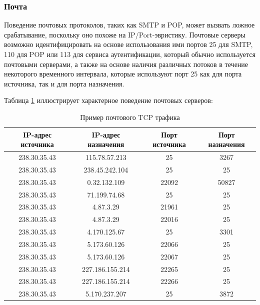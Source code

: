\documentclass[bachelor, och, coursework]{SCWorks}
\begin{document}
\subsubsection{Почта}
Поведение почтовых протоколов, таких как SMTP и POP, может вызвать ложное срабатывание, поскольку оно похоже на IP/Port-эвристику. Почтовые серверы возможно идентифицировать на основе использования ими портов 25 для SMTP, 110 для POP или 113 для сервиса аутентификации, который обычно используется почтовыми серверами, а также на основе наличия различных потоков в течение некоторого временного интервала, которые используют порт 25 как для порта источника, так и для порта назначения.

Таблица \ref{table:mail} иллюстрирует характерное поведение почтовых серверов:

\begin{table}[H]
    \caption{Пример почтового TCP трафика}
    \label{table:mail}
    \begin{center}
    {\small
    \begin{tabular}{|c|c|c|c|}
        \hline
    IP-адрес источника & IP-адрес назначения & Порт источника & Порт назначения \\ \hline
    238.30.35.43       &   115.78.57.213     & 25             & 3267 \\ \hline
    238.30.35.43       &    238.45.242.104   & 25             & 25 \\ \hline
    238.30.35.43       &    0.32.132.109     & 22092          & 50827 \\ \hline
    238.30.35.43       &    71.199.74.68     & 25             & 25 \\ \hline
    238.30.35.43       &    4.87.3.29        & 21961          & 25 \\ \hline
    238.30.35.43       &     4.87.3.29       & 22016          & 25 \\ \hline
    238.30.35.43       &     4.170.125.67    & 25             & 3301\\ \hline
    238.30.35.43       &     5.173.60.126    & 22066          & 25 \\ \hline
    238.30.35.43       &     5.173.60.126    & 22067          & 25 \\ \hline
    238.30.35.43       &     227.186.155.214 & 22265          & 25 \\ \hline
    238.30.35.43       &    227.186.155.214  & 22266          & 25\\ \hline
    238.30.35.43       &     5.170.237.207   & 25             & 3872 \\ \hline
    \end{tabular}
    }
    \end{center}
\end{table}
\end{document}

